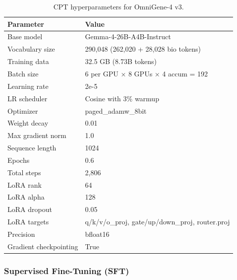 \documentclass[11pt]{article}
\begin{document}
\begin{table}[H]
\centering
\caption{CPT hyperparameters for OmniGene-4 v3.}
\begin{tabular}{ll}
\toprule
\textbf{Parameter} & \textbf{Value} \\
\midrule
Base model & Gemma-4-26B-A4B-Instruct \\
Vocabulary size & 290,048 (262,020 + 28,028 bio tokens) \\
Training data & 32.5 GB (8.73B tokens) \\
Batch size & 6 per GPU × 8 GPUs × 4 accum = 192 \\
Learning rate & 2e-5 \\
LR scheduler & Cosine with 3\% warmup \\
Optimizer & paged\_adamw\_8bit \\
Weight decay & 0.01 \\
Max gradient norm & 1.0 \\
Sequence length & 1024 \\
Epochs & 0.6 \\
Total steps & 2,806 \\
LoRA rank & 64 \\
LoRA alpha & 128 \\
LoRA dropout & 0.05 \\
LoRA targets & q/k/v/o\_proj, gate/up/down\_proj, router.proj \\
Precision & bfloat16 \\
Gradient checkpointing & True \\
\bottomrule
\end{tabular}
\end{table}

\subsubsection{Supervised Fine-Tuning (SFT)}
\end{document}
